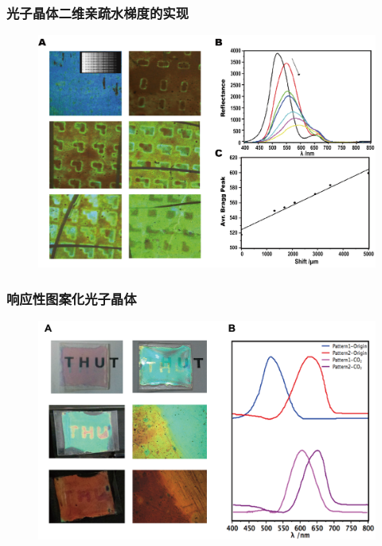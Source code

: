\documentclass{beamer}
\begin{document}
\begin{frame}
  \frametitle{光子晶体二维亲疏水梯度的实现}
  \begin{figure}[htbp]
  \centering
    \includegraphics[width=0.90\linewidth]{figures/gradient-2D.png}
  \end{figure}
\end{frame}


\begin{frame}
  \frametitle{响应性图案化光子晶体}
  \begin{figure}
  \centering
  \includegraphics[width=0.95\linewidth]{figures/pattern-dynamic.png}
  \end{figure}
\end{frame}
\end{document}
